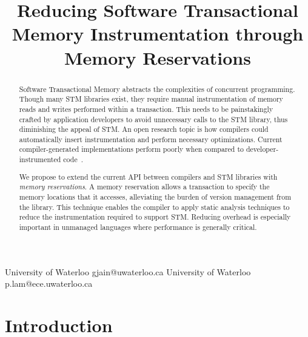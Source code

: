 \documentclass[preprint]{sigplanconf}
\begin{document}
\lstset{language=C++}

\copyrightdata{[to be supplied]} 


\title{Reducing Software Transactional Memory Instrumentation through Memory Reservations}

{University of Waterloo}
{gjain@uwaterloo.ca}
{University of Waterloo}
{p.lam@ece.uwaterloo.ca}

\maketitle

\begin{abstract}

    Software Transactional Memory abstracts the complexities of concurrent programming. Though many STM libraries exist, they require manual instrumentation of memory reads and writes performed within a transaction. This needs to be painstakingly crafted by application developers to avoid unnecessary calls to the STM library, thus diminishing the appeal of STM. An open research topic is how compilers could automatically insert instrumentation and perform necessary optimizations. Current compiler-generated implementations perform poorly when compared to developer-instrumented code~\cite{Cascaval:2008:STM:1454456.1454466}.

    We propose to extend the current API between compilers and STM libraries with \emph{memory reservations}. A memory reservation allows a transaction to specify the memory locations that it accesses, alleviating the burden of version management from the library. This technique enables the compiler to apply static analysis techniques to reduce the instrumentation required to support STM. Reducing overhead is especially important in unmanaged languages where performance is generally critical.

\end{abstract}

\section{Introduction}
\end{document}
